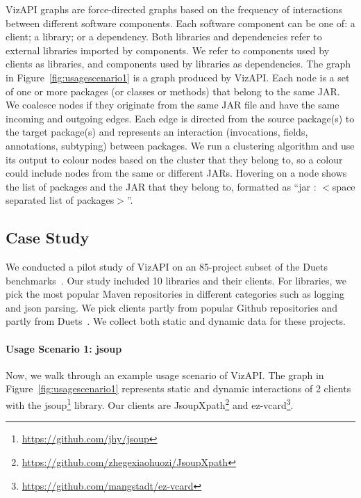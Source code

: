 VizAPI graphs are force-directed graphs based on the
frequency of interactions between different software components. 
Each software component can be one of: a client; a library; or a dependency.
Both libraries and dependencies refer to external libraries imported by components.
We refer to components used by clients as libraries, and components used by libraries
as dependencies. The graph in Figure~\ref{fig:usagescenario1}
is a graph produced by VizAPI.
Each node is a set of one or more packages (or classes or methods) 
that belong to the same JAR. We coalesce nodes if they originate from the same 
JAR file and have the same incoming and outgoing edges. Each edge is directed 
from the source package(s) to the target package(s) and represents an interaction 
(invocations, fields, annotations, subtyping) between packages. We run a 
clustering algorithm and use its output to colour nodes based on the cluster 
that they belong to, so a colour could include nodes from the same or different JARs.
Hovering on a node shows the list of packages and 
the JAR that they belong to, 
formatted as “jar : $<$space separated list of packages$>$”.

\subsection{Case Study}
\label{subsec:evaluation}

We conducted a pilot study of VizAPI on an 85-project subset of the
Duets benchmarks~\cite{durieux21}. Our study included 10 libraries and
their clients. For libraries, we pick the most popular Maven repositories 
in different categories such as logging and json parsing. We pick clients partly
from popular Github repositories and partly from Duets~\cite{durieux21}.
We collect both static and dynamic data for these projects.

\paragraph{Usage Scenario 1: jsoup}
Now, we walk through an example usage scenario of VizAPI.
The graph in Figure~\ref{fig:usagescenario1} represents static and dynamic interactions of 2 clients with the jsoup\footnote{\url{https://github.com/jhy/jsoup}\label{jsoup}} library. Our clients are JsoupXpath\footnote{\url{https://github.com/zhegexiaohuozi/JsoupXpath}\label{jsoupxpath}} and ez-vcard\footnote{\url{https://github.com/mangstadt/ez-vcard}\label{ez-vcard}}.

